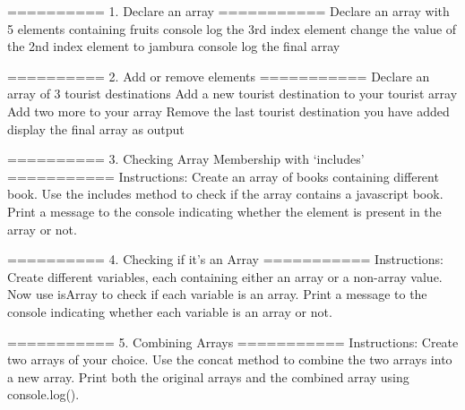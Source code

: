 
========== 1. Declare an array ===========
Declare an array with 5 elements containing fruits
console log the 3rd index element
change the value of the 2nd index element to jambura
console log the final array

========== 2. Add or remove elements ===========
Declare an array of 3 tourist destinations
Add a new tourist destination to your tourist array
Add two more to your array
Remove the last tourist destination you have added
display the final array as output


========== 3. Checking Array Membership with ‘includes’ ===========
Instructions:
Create an array of books containing different book.
Use the includes method to check if the array contains a javascript book.
Print a message to the console indicating whether the element is present in the array or not.

========== 4. Checking if it's an Array ===========
Instructions:
Create different variables, each containing either an array or a non-array value.
Now use isArray to check if each variable is an array.
Print a message to the console indicating whether each variable is an array or not.

=========== 5. Combining Arrays ===========
Instructions:
Create two arrays of your choice.
Use the concat method to combine the two arrays into a new array.
Print both the original arrays and the combined array using console.log().